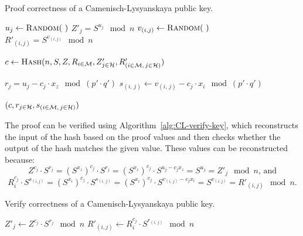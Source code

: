 \begin{algorithm}
  \caption{Proof correctness of a Camenisch-Lysyanskaya public key.}
  \label{alg:CL-proof-key}
  \addtolength{\baselineskip}{1mm}
  \begin{algorithmic}[1]
        \State $u_j \gets \Call{Random}{~}$
        \State $Z'_j = S^{u_j} \mod n$
          \State $v_{(i,j)} \gets \Call{Random}{~}$
          \State $R'_{(i,j)} = S^{v_{(i,j)}} \mod n$
        \EndFor
      \EndFor

      \State $c \gets \Call{Hash}{n, S, Z, R_{i \in \M}, Z'_{j \in \mathcal{H}}, R'_{(i \in \M,\, j \in \mathcal{H})}}$

        \State $r_j = u_j - c_j \cdot x_z \mod (p' \cdot q')$
          \State $s_{(i,\, j)} \gets v_{(i,\, j)} - c_j \cdot x_i \mod (p' \cdot q')$
        \EndFor
      \EndFor

      \Return $(c, r_{j \in \mathcal{H}}, s_{(i \in \mathcal{M},\, j \in \mathcal{H})})$
    \EndFunction
  \end{algorithmic}
\end{algorithm}

The proof can be verified using Algorithm~\ref{alg:CL-verify-key}, which
reconstructs the input of the hash based on the proof values and then checks
whether the output of the hash matches the given value. These values can be
reconstructed because:
\begin{equation*}
  Z^{c_j} \cdot S^{r_j}
  = (S^{x_z})^{c_j} \cdot S^{r_j}
  = (S^{x_z})^{c_j} \cdot S^{u_j - c_j x_z}
  = S^{u_j}
  = Z'_j \mod n \text{, and}
\end{equation*}
\begin{equation*}
  R_i^{c_j} \cdot S^{s_{(i,j)}}
  = (S^{x_i})^{c_j} \cdot S^{s_{(i,\, j)}}
  = (S^{x_i})^{c_j} \cdot S^{v_{(i,\, j)}-c_j x_i}
  = S^{v_{(i,j)}}
  = R'_{(i,j)} \mod n \text{.}
\end{equation*}

\begin{algorithm}[t]
  \caption{Verify correctness of a Camenisch-Lysyanskaya public key.}
  \label{alg:CL-verify-key}
  \addtolength{\baselineskip}{1mm}
  \begin{algorithmic}[1]
        \State $Z'_j \gets Z^{c_j} \cdot S^{r_j} \mod n$
          \State $R'_{(i,j)} \gets R_i^{c_j} \cdot S^{r_{(i,\, j)}} \mod n$
        \EndFor
      \EndFor

        \Return {}
      \EndIf

      \Return {}
    \EndFunction
  \end{algorithmic}
\end{algorithm}

